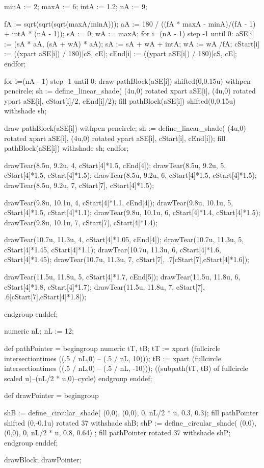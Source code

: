 minA := 2; %
maxA := 6; %
intA := 1.2; %
nA := 9; %

fA := sqrt(sqrt(sqrt(maxA/minA)));
aA := 180 / ((fA * maxA - minA)/(fA - 1) + intA * (nA - 1)); %
sA := 0; %
wA := maxA; %
for i=(nA - 1) step -1 until 0:
	aSE[i] := (sA * aA, (sA + wA) * aA);
	sA := sA + wA + intA;
	wA := wA /fA;
	cStart[i] := ((xpart aSE[i]) / 180)[cS, cE];
	cEnd[i] := ((ypart aSE[i]) / 180)[cS, cE];
endfor;

for i=(nA - 1) step -1 until 0:
	draw pathBlock(aSE[i]) shifted(0,0.15u) withpen pencircle;
	sh := define_linear_shade(
			(4u,0) rotated xpart aSE[i],
			(4u,0) rotated ypart aSE[i],
			cStart[i]/2,
			cEnd[i]/2);
	fill pathBlock(aSE[i]) shifted(0,0.15u) withshade sh;

	draw pathBlock(aSE[i]) withpen pencircle;
	sh := define_linear_shade(
			(4u,0) rotated xpart aSE[i],
			(4u,0) rotated ypart aSE[i],
			cStart[i],
			cEnd[i]);
	fill pathBlock(aSE[i]) withshade sh;
endfor;

drawTear(8.5u, 9.2u, 4, cStart[4]*1.5, cEnd[4]);
drawTear(8.5u, 9.2u, 5, cStart[4]*1.5, cStart[4]*1.5);
drawTear(8.5u, 9.2u, 6, cStart[4]*1.5, cStart[4]*1.5);
drawTear(8.5u, 9.2u, 7, cStart[7], cStart[4]*1.5);

drawTear(9.8u, 10.1u, 4, cStart[4]*1.1, cEnd[4]);
drawTear(9.8u, 10.1u, 5, cStart[4]*1.5, cStart[4]*1.1);
drawTear(9.8u, 10.1u, 6, cStart[4]*1.4, cStart[4]*1.5);
drawTear(9.8u, 10.1u, 7, cStart[7], cStart[4]*1.4);

drawTear(10.7u, 11.3u, 4, cStart[4]*1.05, cEnd[4]);
drawTear(10.7u, 11.3u, 5, cStart[4]*1.45, cStart[4]*1.1);
drawTear(10.7u, 11.3u, 6, cStart[4]*1.6, cStart[4]*1.45);
drawTear(10.7u, 11.3u, 7, cStart[7], .7[cStart[7],cStart[4]*1.6]);

drawTear(11.5u, 11.8u, 5, cStart[4]*1.7, cEnd[5]);
drawTear(11.5u, 11.8u, 6, cStart[4]*1.8, cStart[4]*1.7);
drawTear(11.5u, 11.8u, 7, cStart[7], .6[cStart[7],cStart[4]*1.8]);

endgroup
enddef;

numeric nL;
nL := 12; %

def pathPointer =
begingroup
numeric tT, tB;
tT := xpart (fullcircle intersectiontimes ((.5 / nL,0) -- (.5 / nL, 10)));
tB := xpart (fullcircle intersectiontimes ((.5 / nL,0) -- (.5 / nL, -10)));
((subpath(tT, tB) of fullcircle scaled u)--(nL/2 * u,0)--cycle)
endgroup
enddef;

def drawPointer =
begingroup

shB := define_circular_shade(
		(0,0),
		(0,0),
		0,
		nL/2 * u,
		0.3,
		0.3);
fill pathPointer shifted (0,-0.1u) rotated 37 withshade shB;
shP := define_circular_shade(
		(0,0),
		(0,0),
		0,
		nL/2 * u,
		0.8,
		0.64) ;
fill pathPointer rotated 37 withshade shP;
endgroup
enddef;

drawBlock;
drawPointer;

\stopreusableMPgraphic
